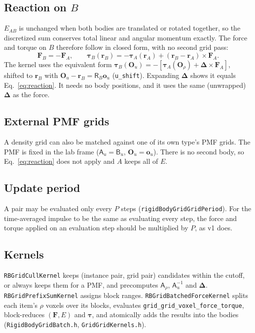 \documentclass[11pt]{article}
\newcommand{\vb}[1]{\bm{#1}}
\newcommand{\code}[1]{\texttt{#1}}
\begin{document}
\subsection{\texorpdfstring{Reaction on $B$}{Reaction on B}}

$E_{AB}$ is unchanged when both bodies are translated or rotated together, so
the discretized sum conserves total linear and angular momentum exactly. The
force and torque on $B$ therefore follow in closed form, with no second grid
pass:
\begin{equation}
  \vb F_B=-\vb F_A,\qquad
  \vb\tau_B(\vb r_B)=-\vb\tau_A(\vb r_A)+(\vb r_B-\vb r_A)\times\vb F_A .
  \label{eq:reaction}
\end{equation}
The kernel uses the equivalent form
$\vb\tau_B(\vb O_u)=-\left[\vb\tau_A(\vb O_\rho)+\vb\Delta\times\vb F_A\right]$,
shifted to $\vb r_B$ with $\vb O_u-\vb r_B=\mathsf R_B\vb o_u$
(\code{u\_shift}). Expanding $\vb\Delta$ shows it equals
Eq.~\eqref{eq:reaction}. It needs no body positions, and it uses the same
(unwrapped) $\vb\Delta$ as the force.

\subsection{External PMF grids}

A density grid can also be matched against one of its own type's PMF grids.
The PMF is fixed in the lab frame ($\mathsf A_u=\mathsf B_u$,
$\vb O_u=\vb o_u$). There is no second body, so Eq.~\eqref{eq:reaction} does
not apply and $A$ keeps all of $E$.

\subsection{Update period}

A pair may be evaluated only every $P$ steps (\code{rigidBodyGridGridPeriod}).
For the time-averaged impulse to be the same as evaluating every step, the
force and torque applied on an evaluation step should be multiplied by $P$, as
v1 does.

\subsection{Kernels}

\code{RBGridCullKernel} keeps (instance pair, grid pair) candidates within the
cutoff, or always keeps them for a PMF, and precomputes
$\mathsf A_\rho$, $\mathsf A_u^{-1}$ and $\vb\Delta$.
\code{RBGridPrefixSumKernel} assigns block ranges.
\code{RBGridBatchedForceKernel} splits each item's $\rho$ voxels over its
blocks, evaluates \code{grid\_grid\_voxel\_force\_torque}, block-reduces
$(\vb F,E)$ and $\vb\tau$, and atomically adds the results into the bodies
(\code{RigidBodyGridBatch.h}, \code{GridGridKernels.h}).
\end{document}
